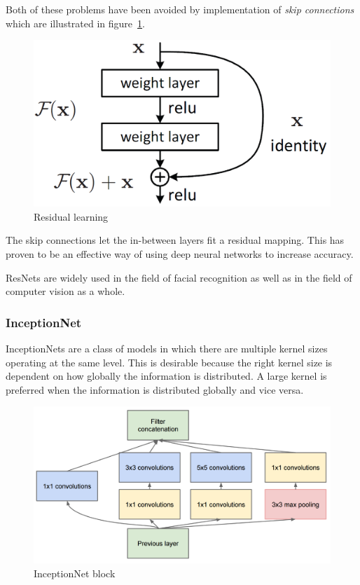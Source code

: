 Both of these problems have been avoided by implementation of \textit{skip connections} which are illustrated in
figure~\ref{fig:ResNet}.

\begin{figure}[H]
    \centering
    \includegraphics[width=0.9\columnwidth]{images/face-recognition/resnet.png}
    \caption{Residual learning~\cite{ResNet}}
    \label{fig:ResNet}
\end{figure}

The skip connections let the in-between layers fit a residual mapping.
This has proven to be an effective way of using deep neural networks to increase accuracy.

ResNets are widely used in the field of facial recognition as well as in the field of computer vision as a whole.

\subsubsection{InceptionNet}\label{subsubsec:inceptionnet}
InceptionNets are a class of models in which there are multiple kernel sizes operating at the same level.
This is desirable because the right kernel size is dependent on how globally the information is distributed.
A large kernel is preferred when the information is distributed globally and vice versa.

\begin{figure}[H]
    \centering
    \includegraphics[width=0.9\columnwidth]{images/face-recognition/inceptionnet.png}
    \caption{InceptionNet block~\cite{GoingDeeper}}
    \label{fig:InceptionNet}
\end{figure}

